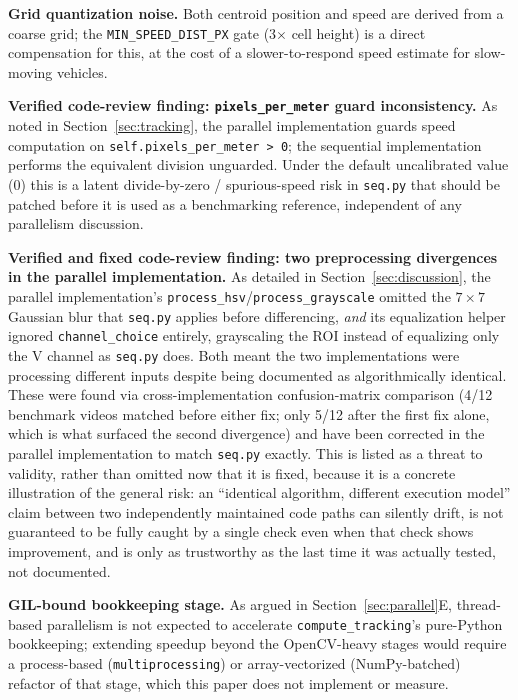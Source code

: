 \documentclass[conference]{IEEEtran}
\newcommand{\code}[1]{\texttt{#1}}
\begin{document}
\textbf{Grid quantization noise.} Both centroid position and speed are
derived from a coarse grid; the \code{MIN\_SPEED\_DIST\_PX} gate
(3$\times$ cell height) is a direct compensation for this, at the cost
of a slower-to-respond speed estimate for slow-moving vehicles.

\textbf{Verified code-review finding: \code{pixels\_per\_meter} guard
inconsistency.} As noted in Section~\ref{sec:tracking}, the parallel
implementation guards speed computation on
\code{self.pixels\_per\_meter > 0}; the sequential implementation
performs the equivalent division unguarded. Under the default
uncalibrated value (0) this is a latent divide-by-zero / spurious-speed
risk in \code{seq.py} that should be patched before it is used as a
benchmarking reference, independent of any parallelism discussion.

\textbf{Verified and fixed code-review finding: two preprocessing
divergences in the parallel implementation.} As detailed in
Section~\ref{sec:discussion}, the parallel implementation's
\code{process\_hsv}/\code{process\_grayscale} omitted the $7\times7$
Gaussian blur that \code{seq.py} applies before differencing, \emph{and}
its equalization helper ignored \code{channel\_choice} entirely,
grayscaling the ROI instead of equalizing only the V channel as
\code{seq.py} does. Both meant the two implementations were processing
different inputs despite being documented as algorithmically identical.
These were found via cross-implementation confusion-matrix comparison
(4/12 benchmark videos matched before either fix; only 5/12 after the
first fix alone, which is what surfaced the second divergence) and have
been corrected in the parallel implementation to match \code{seq.py}
exactly. This is listed as a threat to validity, rather than omitted now
that it is fixed, because it is a concrete illustration of the general
risk: an ``identical algorithm, different execution model'' claim
between two independently maintained code paths can silently drift, is
not guaranteed to be fully caught by a single check even when that check
shows improvement, and is only as trustworthy as the last time it was
actually tested, not documented.

\textbf{GIL-bound bookkeeping stage.} As argued in
Section~\ref{sec:parallel}E, thread-based parallelism is not expected to
accelerate \code{compute\_tracking}'s pure-Python bookkeeping; extending
speedup beyond the OpenCV-heavy stages would require a process-based
(\code{multiprocessing}) or array-vectorized (NumPy-batched) refactor of
that stage, which this paper does not implement or measure.
\end{document}
